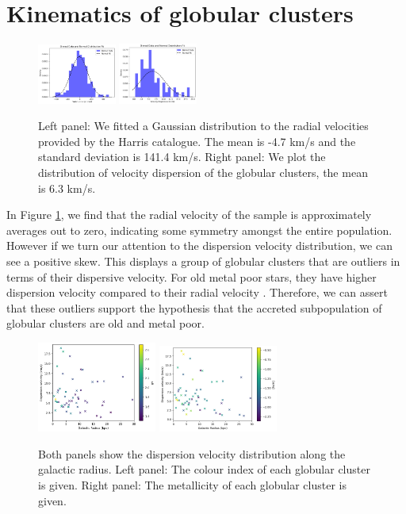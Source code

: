 \documentclass[fleqn,usenatbib]{mnras}
\begin{document}
\section{Kinematics of globular clusters}
\begin{figure}
    \centering
    \includegraphics[width=0.23\textwidth]{norm1.png}
    \includegraphics[width=0.23\textwidth]{norm2.png}
    \caption{Left panel: We fitted a Gaussian distribution to the radial velocities provided 
    by the Harris catalogue. The mean is -4.7 km/s and the standard deviation is 141.4 km/s.
    Right panel: We plot the distribution of velocity dispersion of the globular clusters, 
    the mean is 6.3 km/s.}
    \label{fig:norm}
\end{figure}

In Figure \ref{fig:norm}, we find that the radial velocity of the sample is approximately averages out 
to zero, indicating some symmetry amongst the entire population. However if we turn our attention to the 
dispersion velocity distribution, we can see a positive skew. This displays a group of globular clusters 
that are outliers in terms of their dispersive velocity. For old metal poor stars, they have higher 
dispersion velocity compared to their radial velocity \citep{Yu_2017}. Therefore, we can assert that 
these outliers support the hypothesis that the accreted subpopulation of globular clusters are old and 
metal poor.

\begin{figure}
    \includegraphics[width=0.35\textwidth]{rgcsigv.png}
    \includegraphics[width=0.35\textwidth]{rgcsigv1.png}
    \caption{Both panels show the dispersion velocity distribution along the galactic radius.
    Left panel: The colour index of each globular cluster is given. Right panel: The metallicity
    of each globular cluster is given.}
    \label{fig:dispersion}
\end{figure}
\end{document}
